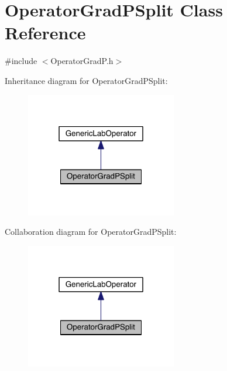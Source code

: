 \hypertarget{class_operator_grad_p_split}{}\section{Operator\+Grad\+P\+Split Class Reference}
\label{class_operator_grad_p_split}


{\ttfamily \#include $<$Operator\+Grad\+P.\+h$>$}



Inheritance diagram for Operator\+Grad\+P\+Split\+:\nopagebreak
\begin{figure}[H]
\begin{center}
\leavevmode
\includegraphics[width=187pt]{dc/d65/class_operator_grad_p_split__inherit__graph}
\end{center}
\end{figure}


Collaboration diagram for Operator\+Grad\+P\+Split\+:\nopagebreak
\begin{figure}[H]
\begin{center}
\leavevmode
\includegraphics[width=187pt]{d0/d73/class_operator_grad_p_split__coll__graph}
\end{center}
\end{figure}

